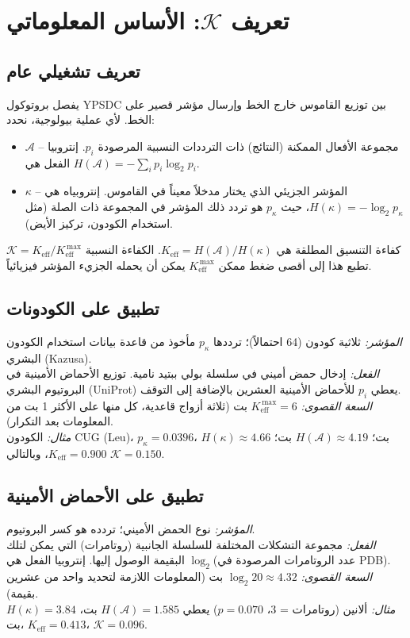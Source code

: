 \documentclass[11pt,a4paper]{article}
\newcommand{\REL}{\mathcal{K}}
\newcommand{\ABS}{K_{\mathrm{eff}}}
\begin{document}
	\section{تعريف \(\REL\): الأساس المعلوماتي}
	\label{sec:REL-def}
	
	\subsection{تعريف تشغيلي عام}
	يفصل بروتوكول YPSDC بين توزيع القاموس خارج الخط وإرسال مؤشر قصير على الخط. لأي عملية بيولوجية، نحدد:
	\begin{itemize}
		\item \(\mathcal{A}\) – مجموعة الأفعال الممكنة (النتائج) ذات الترددات النسبية المرصودة \(p_i\). إنتروبيا الفعل هي \(H(\mathcal{A}) = -\sum_i p_i \log_2 p_i\).
		\item \(\kappa\) – المؤشر الجزيئي الذي يختار مدخلاً معيناً في القاموس. إنتروبياه هي \(H(\kappa) = -\log_2 p_\kappa\)، حيث \(p_\kappa\) هو تردد ذلك المؤشر في المجموعة ذات الصلة (مثل استخدام الكودون، تركيز الأيض).
	\end{itemize}
	كفاءة التنسيق المطلقة هي \(\ABS = H(\mathcal{A})/H(\kappa)\). الكفاءة النسبية \(\REL = \ABS / \ABS^{\,\max}\) تطبع هذا إلى أقصى ضغط ممكن \(\ABS^{\,\max}\) يمكن أن يحمله الجزيء المؤشر فيزيائياً.
	
	\subsection{تطبيق على الكودونات}
	\textit{المؤشر:} ثلاثية كودون (64 احتمالاً)؛ ترددها \(p_\kappa\) مأخوذ من قاعدة بيانات استخدام الكودون البشري (Kazusa). \\
	\textit{الفعل:} إدخال حمض أميني في سلسلة بولي ببتيد نامية. توزيع الأحماض الأمينية في البروتيوم البشري (UniProt) يعطي \(p_i\) للأحماض الأمينية العشرين بالإضافة إلى التوقف. \\
	\textit{السعة القصوى:} \(\ABS^{\,\max}=6\) بت (ثلاثة أزواج قاعدية، كل منها على الأكثر 1 بت من المعلومات بعد التكرار). \\
	\textit{مثال:} الكودون CUG (Leu)، \(p_\kappa=0.0396\)، \(H(\kappa)\approx4.66\) بت؛ \(H(\mathcal{A})\approx4.19\) بت؛ \(\ABS=0.900\)، وبالتالي \(\REL=0.150\).
	
	\subsection{تطبيق على الأحماض الأمينية}
	\textit{المؤشر:} نوع الحمض الأميني؛ تردده هو كسر البروتيوم. \\
	\textit{الفعل:} مجموعة التشكلات المختلفة للسلسلة الجانبية (روتامرات) التي يمكن لتلك البقيمة الوصول إليها. إنتروبيا الفعل هي \(\log_2\)(عدد الروتامرات المرصودة في PDB). \\
	\textit{السعة القصوى:} \(\log_2 20 \approx 4.32\) بت (المعلومات اللازمة لتحديد واحد من عشرين بقيمة). \\
	\textit{مثال:} ألانين (روتامرات = 3، \(p=0.070\)) يعطي \(H(\mathcal{A})=1.585\) بت، \(H(\kappa)=3.84\) بت، \(\ABS=0.413\)، \(\REL=0.096\).
	
\end{document}
